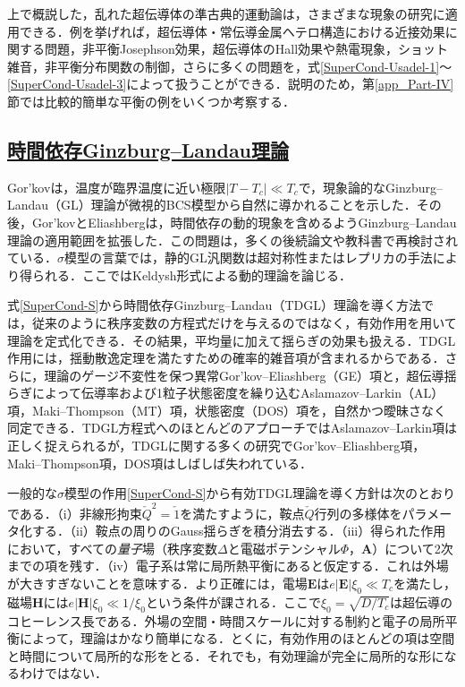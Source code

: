 \documentclass[a4paper,11pt]{ltjsarticle}
\newcommand{\subsectionlink}[1]{\subsection[#1]{\hyperlink{toc}{#1}}}
\begin{document}
上で概説した，乱れた超伝導体の準古典的運動論は，さまざまな現象の研究に適用できる．例を挙げれば，超伝導体・常伝導金属ヘテロ構造における近接効果に関する問題\cite{BelzigBruder,Gueron,Zhou,Hammer}，非平衡Josephson効果\cite{Heikkila,Wilhelm}，超伝導体のHall効果\cite{ZhouSpivak}や熱電現象\cite{StoofNazarov,Virtanen}，ショット雑音\cite{Stenberg}，非平衡分布関数の制御\cite{Crosser}，さらに多くの問題を，式\eqref{SuperCond-Usadel-1}〜\eqref{SuperCond-Usadel-3}によって扱うことができる．説明のため，第\ref{app_Part-IV}節では比較的簡単な平衡の例をいくつか考察する．

\subsectionlink{時間依存Ginzburg--Landau理論}\label{sec_SuperCond-3}

Gor'kov\cite{Gor'kov-GL}は，温度が臨界温度に近い極限$|T-T_{c}|\ll T_{c}$で，現象論的なGinzburg--Landau（GL）理論\cite{GinzburgLandau}が微視的BCS模型から自然に導かれることを示した．その後，Gor'kovとEliashberg\cite{Gor'kovEliashberg}は，時間依存の動的現象を含めるようGinzburg--Landau理論の適用範囲を拡張した．この問題は，多くの後続論文\cite{HoughtonMaki,HuThompson,Kramer,SchonAmbegaokar,Hu,Krempasky,Otterlo}や教科書\cite{Tinkham,Kopnin,Larkin-Varlamov}で再検討されている．$\sigma$模型の言葉では，静的GL汎関数は超対称性\cite{AltlandSimons}またはレプリカ\cite{YurkevichLerner}の手法により得られる．ここではKeldysh形式による動的理論\cite{LevchenkoKamenev}を論じる．

式\eqref{SuperCond-S}から時間依存Ginzburg--Landau（TDGL）理論を導く方法では，従来のように秩序変数の方程式だけを与えるのではなく，有効作用を用いて理論を定式化できる．その結果，平均量に加えて揺らぎの効果も扱える．TDGL作用には，揺動散逸定理を満たすための確率的雑音項が含まれるからである．さらに，理論のゲージ不変性を保つ異常Gor'kov--Eliashberg（GE）項\cite{Gor'kovEliashberg}と，超伝導揺らぎによって伝導率および1粒子状態密度を繰り込むAslamazov--Larkin（AL）項\cite{AslamazovLarkin}，Maki--Thompson（MT）項\cite{Maki}，状態密度（DOS）項\cite{Hurault}を，自然かつ曖昧さなく同定できる．TDGL方程式へのほとんどのアプローチではAslamazov--Larkin項は正しく捉えられるが，TDGLに関する多くの研究でGor'kov--Eliashberg項，Maki--Thompson項，DOS項はしばしば失われている．

一般的な$\sigma$模型の作用\eqref{SuperCond-S}から有効TDGL理論を導く方針は次のとおりである．（i）非線形拘束$\check Q^2=\check{1}$を満たすように，鞍点$\check Q$行列の多様体をパラメータ化する．（ii）鞍点の周りのGauss揺らぎを積分消去する．（iii）得られた作用において，すべての\textit{量子}場（秩序変数$\Delta$と電磁ポテンシャル$\Phi$，$\mathbf{A}$）について2次までの項を残す．（iv）電子系は常に局所熱平衡にあると仮定する．これは外場が大きすぎないことを意味する．より正確には，電場$\mathbf{E}$は$e|\mathbf{E}|\xi_0\ll T_c$を満たし，磁場$\mathbf{H}$には$e|\mathbf{H}|\xi_0\ll1/\xi_0$という条件が課される．ここで$\xi_{0}=\sqrt{D/T_{c}}$は超伝導のコヒーレンス長である．外場の空間・時間スケールに対する制約と電子の局所平衡によって，理論はかなり簡単になる．とくに，有効作用のほとんどの項は空間と時間について局所的な形をとる．それでも，有効理論が完全に局所的な形になるわけではない．
\end{document}
